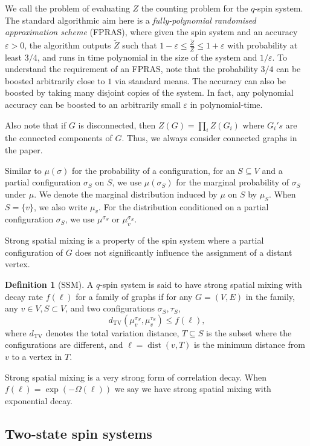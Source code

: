 \documentclass[11pt]{amsart}
\newcommand{\eps}{\varepsilon}
\newcommand{\dist}{\operatorname{dist}}
\theoremstyle{definition}
\newtheorem{definition}[theorem]{Definition}
\theoremstyle{remark}
\newcommand{\dTV}{d_{\mathrm{TV}}}
\begin{document}
We call the problem of evaluating $Z$ the counting problem for the $q$-spin system.
The standard algorithmic aim here is a \emph{fully-polynomial randomised approximation scheme} (FPRAS),
where given the spin system and an accuracy $\eps>0$,
the algorithm outputs $\widetilde{Z}$ such that $1-\eps\le\frac{\widetilde{Z}}{Z}\le 1+\eps$ with probability at least $3/4$, and runs in time polynomial in the size of the system and $1/\eps$.
To understand the requirement of an FPRAS, note that the probability $3/4$ can be boosted arbitrarily close to $1$ via standard means.
The accuracy can also be boosted by taking many disjoint copies of the system.
In fact, any polynomial accuracy can be boosted to an arbitrarily small $\eps$ in polynomial-time.

Also note that if $G$ is disconnected, then $Z(G)=\prod_{i}Z(G_i)$ where $G_i's$ are the connected components of $G$.
Thus, we always consider connected graphs in the paper.

Similar to $\mu(\sigma)$ for the probability of a configuration, for an $S\subseteq V$ and a partial configuration $\sigma_S$ on $S$, we use $\mu(\sigma_S)$ for the marginal probability of $\sigma_S$ under $\mu$.
We denote the marginal distribution induced by $\mu$ on $S$ by $\mu_S$.
When $S=\{v\}$, we also write $\mu_v$. For the distribution conditioned on a partial configuration $\sigma_S$, we use $\mu^{\sigma_S}$ or $\mu_v^{\sigma_S}$. 

Strong spatial mixing is a property of the spin system where a partial configuration of $G$ does not significantly influence the assignment of a distant vertex. 

\begin{definition}[SSM]\label{def:SSM}
A $q$-spin system is said to have strong spatial mixing with decay rate $f(\ell)$ for a family of graphs if for any $G=(V,E)$ in the family, any $v\in V, S\subset V$, and two configurations $\sigma_S,\tau_S$,
\[\dTV(\mu_v^{\sigma_S},\mu_v^{\tau_S})\leq f(\ell),\]
where $\dTV$ denotes the total variation distance, $T\subseteq S$ is the subset where the configurations are different, and $\ell=\dist(v,T)$ is the minimum distance from $v$ to a vertex in $T$. 
\end{definition}

Strong spatial mixing is a very strong form of correlation decay. When $f(\ell)=\exp(-\Omega(\ell))$ we say we have strong spatial mixing with exponential decay. 

\subsection{Two-state spin systems}
\end{document}

